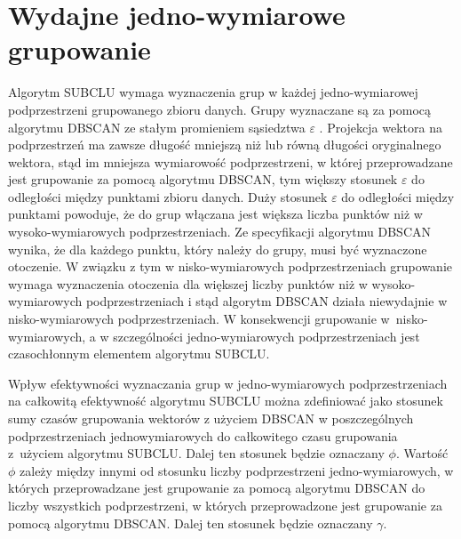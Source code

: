 \section{Wydajne jedno-wymiarowe grupowanie}
Algorytm SUBCLU \cite{subclu} wymaga wyznaczenia grup w każdej jedno-wymiarowej podprzestrzeni grupowanego zbioru danych. Grupy wyznaczane są za pomocą algorytmu DBSCAN \cite{dbscan} ze stałym promieniem sąsiedztwa $\varepsilon$ . Projekcja wektora na podprzestrzeń ma zawsze długość mniejszą niż lub równą długości oryginalnego wektora, stąd im mniejsza wymiarowość podprzestrzeni, w której przeprowadzane jest grupowanie za pomocą algorytmu DBSCAN, tym większy stosunek $\varepsilon$ do odległości między punktami zbioru danych. Duży stosunek $\varepsilon$ do odległości między punktami powoduje, że do grup włączana jest większa liczba punktów niż w wysoko-wymiarowych podprzestrzeniach. Ze specyfikacji algorytmu DBSCAN wynika, że dla każdego punktu, który należy do grupy, musi być wyznaczone otoczenie. W związku z tym w nisko-wymiarowych podprzestrzeniach grupowanie wymaga wyznaczenia otoczenia dla większej liczby punktów niż w wysoko-wymiarowych podprzestrzeniach i stąd algorytm DBSCAN działa niewydajnie w nisko-wymiarowych podprzestrzeniach. W konsekwencji grupowanie \mbox{w nisko-wymiarowych}, a w szczególności jedno-wymiarowych podprzestrzeniach jest czasochłonnym elementem algorytmu SUBCLU.\par

Wpływ efektywności wyznaczania grup w jedno-wymiarowych podprzestrzeniach na całkowitą efektywność algorytmu SUBCLU można zdefiniować jako stosunek sumy czasów grupowania wektorów z użyciem DBSCAN w poszczególnych podprzestrzeniach jednowymiarowych do całkowitego czasu grupowania \mbox{z użyciem} algorytmu SUBCLU. Dalej ten stosunek będzie oznaczany $ \phi $. Wartość $ \phi $ zależy między innymi od stosunku liczby podprzestrzeni jedno-wymiarowych, w których przeprowadzane jest grupowanie za pomocą algorytmu DBSCAN do liczby wszystkich podprzestrzeni, w których przeprowadzone jest grupowanie za pomocą algorytmu DBSCAN. Dalej ten stosunek będzie oznaczany $ \gamma $.\par

